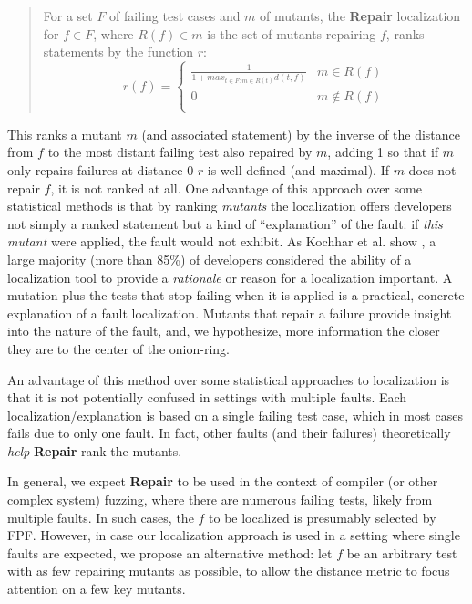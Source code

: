 \begin{quote}
For a set $F$ of failing test cases and $m$ of mutants, 
the {\bf Repair} localization for $f \in F$, where $R(f) \in m$ is the set
of mutants repairing $f$, ranks
statements by the function $r$:
\[
r(f) = 
\begin{cases}
\frac{1}{1 + max_{t \in F: m \in R(t)} d(t,f)} & m \in R(f)\\
0 & m \not\in R(f)\\
\end{cases}
\]
\end{quote}

This ranks a mutant $m$ (and associated statement) by the inverse of the distance
from $f$ to the most distant failing test also repaired by $m$, adding 1
so that if $m$ only repairs failures at distance 0 $r$ is well defined
(and maximal).
If $m$ does not repair $f$, it is not ranked at all.  One advantage of
this approach over some statistical methods is that by
ranking \emph{mutants} the localization offers developers not simply a
ranked statement but a kind of ``explanation'' \cite{GroceError} of the fault:  if \emph{this
mutant} were applied, the fault would not exhibit.  As Kochhar et
al. show \cite{Kochhar}, a large majority (more than 85\%) of developers considered
the ability of a localization tool to provide a \emph{rationale} or
reason for a localization important.  A mutation plus the tests that
stop failing when it is applied is a practical, concrete explanation
of a fault localization.  Mutants that repair a failure provide insight 
into the nature of the fault, and, we hypothesize, more information the 
closer they are to the center of the onion-ring. 

An advantage of this method over some statistical approaches to
localization is that it is not potentially confused in
settings with multiple faults.  Each localization/explanation is based
on a single failing test case, which in most cases fails due to only one
fault.  In fact, other faults (and their failures) theoretically \emph{help} {\bf Repair} rank the mutants.

In general, we expect {\bf Repair} to be used in the context of
compiler (or other complex system) fuzzing, where there are numerous
failing tests, likely from multiple faults.  In such cases, the $f$ to
be localized is presumably selected by FPF.  However, in case our
localization approach is used in a setting where single faults are
expected, we propose an alternative method: let $f$ be an arbitrary
test with as few repairing mutants as possible, to allow the distance
metric to focus attention on a few key mutants. 

